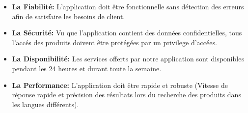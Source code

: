 \begin{itemize}
    \item \small\textbf{La Fiabilité: } L'application doit être fonctionnelle sans détection des erreurs afin de satisfaire les besoins de client.

    \item \small\textbf{La Sécurité: } Vu que l'application contient des données confidentielles, tous l'accés des produits doivent être protégées par un privilege d'accées.

     \item \small\textbf{La Disponibilité: } Les services offerts par notre application sont disponibles pendant les 24
     heures et durant toute la semaine.

     \item \small\textbf{La Performance: } L'application doit être rapide et robuste (Vitesse de réponse rapide et précision des résultats lors du recherche des produits dans les langues différents).
\end{itemize}

\newpage